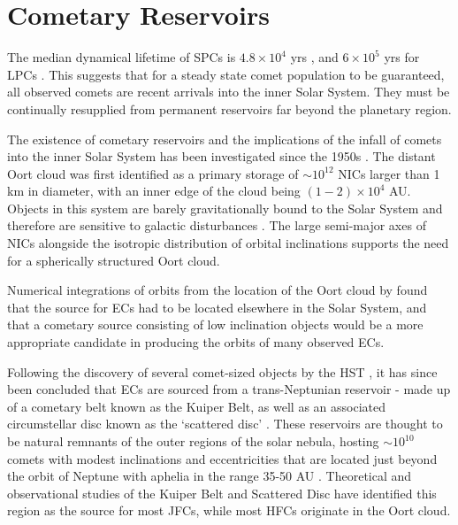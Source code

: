 
\vspace{-.5ex}
\section{Cometary Reservoirs}
\label{sec:origin_of_comets}


The median dynamical lifetime of SPCs is $4.8\times10^4$ yrs \citep{1991AJ....102..787L}, and $6\times10^5$ yrs for LPCs \citep{1979IAUS...81..277W}. This suggests that for a steady state comet population to be guaranteed, all observed comets are recent arrivals into the inner Solar System. They must be continually resupplied from permanent reservoirs far beyond the planetary region.

The existence of cometary reservoirs and the implications of the infall of comets into the inner Solar System has been investigated since the 1950s \citep{1950BAN....11...91O, 1951PNAS...37....1K}. The distant Oort cloud was first identified as a primary storage of $\sim10^{12}$ NICs larger than 1 km in diameter, with an inner edge of the cloud being $(1-2)\times10^4$ AU. Objects in this system are barely gravitationally bound to the Solar System and therefore are sensitive to galactic disturbances \citep{1981AJ.....86.1730H}. The large semi-major axes of NICs alongside the isotropic distribution of orbital inclinations supports the need for a spherically structured Oort cloud.

Numerical integrations of orbits from the location of the Oort cloud by \cite{1988ApJ...328L..69D} found that the source for ECs had to be located elsewhere in the Solar System, and that a cometary source consisting of low inclination objects would be a more appropriate candidate in producing the orbits of many observed ECs.

Following the discovery of several comet-sized objects by the HST \citep{1995ApJ...455..342C}, it has since been concluded that ECs are sourced from a trans-Neptunian reservoir - made up of a cometary belt known as the Kuiper Belt, as well as an associated circumstellar disc known as the `scattered disc' \citep{1997Sci...276.1670D}. These reservoirs are thought to be natural remnants of the outer regions of the solar nebula, hosting $\sim10^{10}$ comets with modest inclinations and eccentricities that are located just beyond the orbit of Neptune with aphelia in the range 35-50 AU \citep{1993AJ....105.1987H}. Theoretical and observational studies of the Kuiper Belt and Scattered Disc have identified this region as the source for most JFCs, while most HFCs originate in the Oort cloud.

